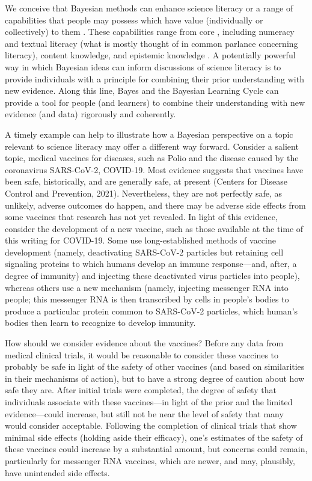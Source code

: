 \documentclass[man]{apa7}
\begin{document}
We conceive that Bayesian methods can enhance science literacy or a range of capabilities that people may possess which have value (individually or collectively) to them \parencite{council2016science}. These capabilities range from core , including numeracy and textual literacy (what is mostly thought of in common parlance concerning literacy), content knowledge, and epistemic knowledge \parencite{council2016science}. A potentially powerful way in which Bayesian ideas can inform discussions of science literacy is to provide individuals with a principle for combining their prior understanding with new evidence. Along this line, Bayes and the Bayesian Learning Cycle can provide a tool for people (and learners) to combine their understanding with new evidence (and data) rigorously and coherently.

A timely example can help to illustrate how a Bayesian perspective on a topic relevant to science literacy may offer a different way forward. Consider a salient topic, medical vaccines for diseases, such as Polio and the disease caused by the coronavirus SARS-CoV-2, COVID-19. Most evidence suggests that vaccines have been safe, historically, and are generally safe, at present (Centers for Disease Control and Prevention, 2021). Nevertheless, they are not perfectly safe, as unlikely, adverse outcomes do happen, and there may be adverse side effects from some vaccines that research has not yet revealed. In light of this evidence, consider the development of a new vaccine, such as those available at the time of this writing for COVID-19. Some use long-established methods of vaccine development (namely, deactivating SARS-CoV-2 particles but retaining cell signaling proteins to which humans develop an immune response—and, after, a degree of immunity) and injecting these deactivated virus particles into people), whereas others use a new mechanism (namely, injecting messenger RNA into people; this messenger RNA is then transcribed by cells in people’s bodies to produce a particular protein common to SARS-CoV-2 particles, which human’s bodies then learn to recognize to develop immunity.  

How should we consider evidence about the vaccines? Before any data from medical clinical trials, it would be reasonable to consider these vaccines to probably be safe in light of the safety of other vaccines (and based on similarities in their mechanisms of action), but to have a strong degree of caution about how safe they are. After initial trials were completed, the degree of safety that individuals associate with these vaccines—in light of the prior and the limited evidence—could increase, but still not be near the level of safety that many would consider acceptable. Following the completion of clinical trials that show minimal side effects (holding aside their efficacy), one’s estimates of the safety of these vaccines could increase by a substantial amount, but concerns could remain, particularly for messenger RNA vaccines, which are newer, and may, plausibly, have unintended side effects.
\end{document}
